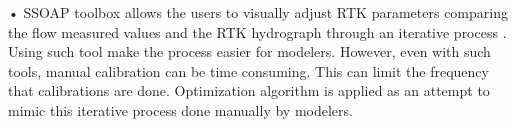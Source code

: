 •	SSOAP toolbox allows the users to visually adjust RTK parameters comparing the flow measured values and the RTK hydrograph through an iterative process \cite{Vallabhaneni2007}. Using such tool make the process easier for modelers. However, even with such tools, manual calibration can be time consuming. This can limit the frequency that calibrations are done. Optimization algorithm is applied as an attempt to mimic this iterative process done manually by modelers. 

